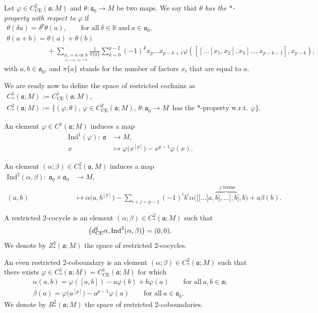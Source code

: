 \documentclass[10pt,a4paper]{amsart}
\numberwithin{equation}{section}
\begin{document}
Let $\varphi\in C^2_{\text{CE}}(\mathfrak{a};M)$ and $\theta\colon \mathfrak{a}_0\rightarrow M$ be two maps.
	We say that $\theta$ \textit{has the $*$-property with respect to} $\varphi$ if
\begin{gather*}
		\theta(\delta a)=\delta^p\theta(a),\qquad \text{for all}\ \delta\in \mathbb K \ \text{and}\ a\in \mathfrak{a}_{\bar 0},\\
		\theta(a+b)=\theta(a)+\theta(b)\\
\phantom{\theta(a+b)=}{}+ \sum_{\underset{x_1=a,~x_2=b}{x_i=a \text{ or } b}} \frac{1}{\pi\{a\}}\sum_{k=0}^{p-2}(-1)^kx_p\dots x_{p-k+1}\varphi([[\dots [x_1,x_2],x_3]\dots ,x_{p-k-1}],x_{p-k}),
\end{gather*}
with $a,b\in \mathfrak{a}_{\bar 0}$, and $\pi\{a\}$ stands for the number of factors $x_i$ that are equal to $a$.

We are ready now to define the space of restricted cochains as
\begin{gather*}
C^1_*(\mathfrak{a};M) := C^1_{\text{CE}}(\mathfrak{a};M),\\
C^2_*(\mathfrak{a};M) := \big\lbrace (\varphi,\theta),\, \varphi\in C^2_{\text{CE}}(\mathfrak{a};M),\,\theta\colon \mathfrak{a}_{{\bar 0}}\rightarrow M \text{ has the $*$-property w.r.t.} \ \varphi \big\rbrace.
\end{gather*}

An element $\varphi \in C^1(\mathfrak{a}; M)$ induces a map
\begin{align*}
\mathrm{Ind}^1(\varphi)\colon\ \mathfrak{a} &\longrightarrow M,\\
x&\longmapsto \varphi\bigl(x^{[p]}\bigr)-x^{p-1}\varphi(x).
\end{align*}

An element $(\alpha;\beta)\in C_*^2(\mathfrak{a},M)$ induces a map
\begin{align*}
	\mathrm{Ind}^2(\alpha,\beta)\colon\ \mathfrak{a}_0 \times \mathfrak{a}_0 & \longrightarrow M, \\
	(a,b)&\longmapsto \alpha\bigl( a,b^{[p]}\bigr) - \sum_{i+j=p-1}(-1)^ib^i \alpha\bigl( [[\dots [a,\overset{j\text{ terms}}{\overbrace{b],\dots ],b}]},b\bigr)+a\beta(b).
	\end{align*}

A restricted $2$-cocycle is an element $(\alpha;\beta)\in C_*^2(\mathfrak{a};M)$ such that
\[
\bigl(d_{\rm CE}^2\alpha,\mathrm{Ind}^2(\alpha,\beta)\bigr)=(0,0).
\]
We denote by $Z_*^2(\mathfrak{a};M)$ the space of restricted 2-cocycles.

An even restricted $2$-coboundary is an element $(\alpha; \beta)\in C_*^2(\mathfrak{a};M)$ such that there exists $\varphi\in C_*^1(\mathfrak{a}; M)=C_{\text{CE}}^1(\mathfrak{a}; M)$ for which
\begin{gather*}
\alpha(a,b) = \varphi([a,b])-a\varphi(b)+b\varphi(a) \qquad \text{for all}\ a,b\in \mathfrak{a}; \\
\beta(a) = \varphi\bigl(a^{[p]}\bigr)-a^{p-1}\varphi(a) \qquad \text{for all} \ a\in \mathfrak{a}_{\bar 0}.
\end{gather*}
We denote by $B_*^2(\mathfrak{a};M)$ the space of restricted 2-coboundaries.
\end{document}
